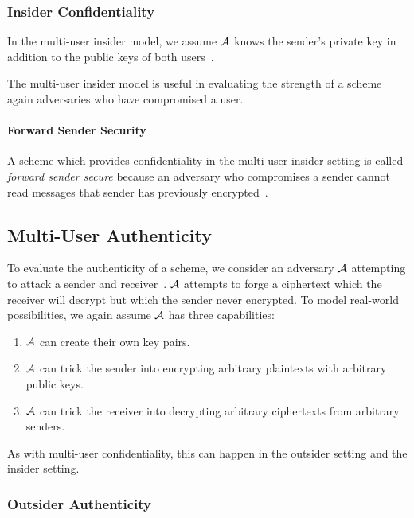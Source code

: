 \subsubsection{Insider Confidentiality}\label{subsubsec:sec-conf-insider}

In the multi-user insider model, we assume $\mathcal{A}$ knows the sender's private key in addition to the public keys of
both users~\cite[p. 45--46]{baek2010}.

The multi-user insider model is useful in evaluating the strength of a scheme again adversaries who have compromised
a user.

\paragraph{Forward Sender Security}

A scheme which provides confidentiality in the multi-user insider setting is called \emph{forward sender secure} because
an adversary who compromises a sender cannot read messages that sender has previously encrypted~\cite{canetti2003}.

\subsection{Multi-User Authenticity}\label{subsec:sec-auth}

To evaluate the authenticity of a scheme, we consider an adversary $\mathcal{A}$ attempting to attack a sender and
receiver~\cite[p. 47]{baek2010}.
$\mathcal{A}$ attempts to forge a ciphertext which the receiver will decrypt but which the sender never encrypted.
To model real-world possibilities, we again assume $\mathcal{A}$ has three capabilities:

\begin{enumerate}
    \item $\mathcal{A}$ can create their own key pairs.
    \item $\mathcal{A}$ can trick the sender into encrypting arbitrary plaintexts with arbitrary public keys.
    \item $\mathcal{A}$ can trick the receiver into decrypting arbitrary ciphertexts from arbitrary senders.
\end{enumerate}

As with multi-user confidentiality, this can happen in the outsider setting and the insider setting.

\subsubsection{Outsider Authenticity}\label{subsubsec:sec-auth-outsider}

